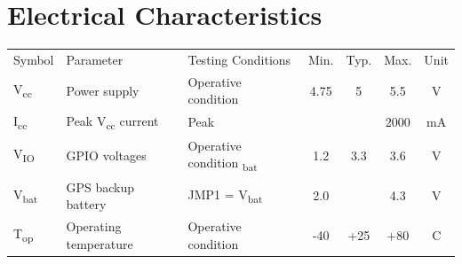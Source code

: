 \documentclass[12pt,article]{memoir}
\begin{document}
\section{Electrical Characteristics}
\begin{tabularx}{\textwidth}{|l|X|X|c|c|c|c|}
	\hline
	Symbol & Parameter & Testing Conditions & Min. &Typ. & Max. &Unit\\\hhline{|=|=|=|=|=|=|=|}
	V\textsubscript{cc} & Power supply & Operative condition & 4.75 & 5 & 5.5 & V\\ \hline
	I\textsubscript{cc} & Peak V\textsubscript{cc} current & Peak & & & 2000 & mA\\ \hline
	V\textsubscript{IO} & GPIO voltages & Operative condition \textsubscript{bat} & 1.2 & 3.3 & 3.6 & V \\ \hline
	V\textsubscript{bat} & GPS backup battery & JMP1 = V\textsubscript{bat} & 2.0 & & 4.3 & V \\ \hline
	T\textsubscript{op} & Operating temperature & Operative condition  & -40 & +25 & +80 & \textdegree{}C \\ \hline
\end{tabularx}
\end{document}
